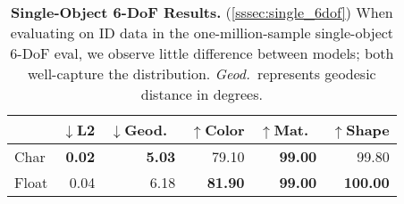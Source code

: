 \begin{table}[b]
\centering
\caption{\textbf{Single-Object 6-DoF Results.} (\cref{sssec:single_6dof})
When evaluating on ID data in the one-million-sample single-object 6-DoF eval, we observe little difference between models; both well-capture the distribution.
\textit{Geod.}~represents geodesic distance in degrees.
}
\begin{tabular}{lrrrrr}
\toprule
& $\downarrow$L2 & $\downarrow$Geod.\ & $\uparrow$Color & $\uparrow$Mat.\ & $\uparrow$Shape \\
\midrule
Char & \textbf{0.02} & \textbf{5.03} & 79.10 & \textbf{99.00} & 99.80 \\
Float & 0.04 & 6.18 & \textbf{81.90} & \textbf{99.00} & \textbf{100.00} \\
\bottomrule
\end{tabular}
\label{table:single_6dof}
\end{table}